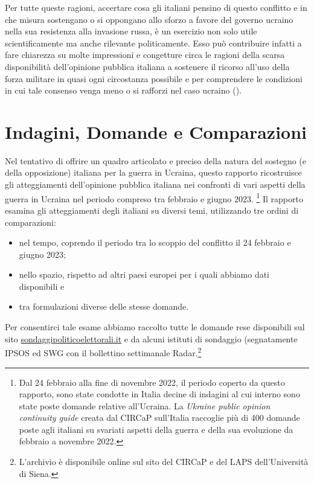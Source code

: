 \documentclass[
  openany]{book}
\begin{document}
Per tutte queste ragioni, accertare cosa gli italiani pensino di questo conflitto e in che misura sostengano o si oppongano allo sforzo a favore del governo ucraino nella sua resistenza alla invasione russa, è un esercizio non solo utile scientificamente ma anche rilevante politicamente. Esso può contribuire infatti a fare chiarezza su molte impressioni e congetture circa le ragioni della scarsa disponibilità dell'opinione pubblica italiana a sostenere il ricorso all'uso della forza militare in quasi ogni circostanza possibile e per comprendere le condizioni in cui tale consenso venga meno o si rafforzi nel caso ucraino (\citet{Everts-e-Isernia2015}).

\hypertarget{indagini-domande-e-comparazioni}{%
\section{Indagini, Domande e Comparazioni}\label{indagini-domande-e-comparazioni}}

Nel tentativo di offrire un quadro articolato e preciso della natura del sostegno (e della opposizione) italiana per la guerra in Ucraina, questo rapporto ricostruisce gli atteggiamenti dell'opinione pubblica italiana nei confronti di vari aspetti della guerra in Ucraina nel periodo compreso tra febbraio e giugno 2023. \footnote{Dal 24 febbraio alla fine di novembre 2022, il periodo coperto da questo rapporto, sono state condotte in Italia decine di indagini al cui interno sono state poste domande relative all'Ucraina. La \emph{Ukraine public opinion continuity guide} creata dal CIRCaP sull'Italia raccoglie più di 400 domande poste agli italiani su svariati aspetti della guerra e della sua evoluzione da febbraio a novembre 2022.} Il rapporto esamina gli atteggiamenti degli italiani su diversi temi, utilizzando tre ordini di comparazioni:

\begin{itemize}
\item
  nel tempo, coprendo il periodo tra lo scoppio del conflitto il 24 febbraio e giugno 2023;
\item
  nello spazio, rispetto ad altri paesi europei per i quali abbiamo dati disponibili e
\item
  tra formulazioni diverse delle stesse domande.
\end{itemize}

Per consentirci tale esame abbiamo raccolto tutte le domande rese disponibili sul sito \href{http://www.sondaggipoliticoelettorali.it/}{sondaggipoliticoelettorali.it} e da alcuni istituti di sondaggio (segnatamente IPSOS ed SWG con il bollettino settimanale Radar.\footnote{L'archivio è disponibile online sul sito del CIRCaP e del LAPS dell'Università di Siena.}
\end{document}

